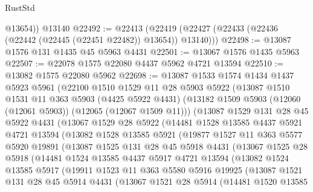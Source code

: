 \begin{lexlean}{RustStd}
\begin{coremodule}
        @13654))
    @13140
@22492 := @22413 (@22419 (@22427 (@22433 (@22436 (@22442 (@22445 (@22451 @22482)) @13654)) @13140)))
@22498 := @13087 @1576 @131 @1435 @45 @5963 @4431
@22501 := @13067 @1576 @1435 @5963
@22507 := @22078 @1575 @22080 @4437 @5962 @4721 @13594
@22510 := @13082 @1575 @22080 @5962
@22698 := @13087
    @1533
    @1574
    @1434
    @1437
    @5923
    @5961
    (@22100
      @1510
      @1529
      @11
      @28
      @5903
      @5922
      (@13087
        @1510
        @1531
        @11
        @363
        @5903
        (@4425 @5922 @4431)
        (@13182 @1509 @5903 (@12060 (@12061 @5903)) (@12065 (@12067 @1509 @11)))
        (@13087
          @1529
          @131
          @28
          @45
          @5922
          @4431
          (@13067
            @1529
            @28
            @5922
            (@14481
              @1528
              @13585
              @4437
              @5921
              @4721
              @13594
              (@13082
                @1528
                @13585
                @5921
                (@19877
                  @1527
                  @11
                  @363
                  @5577
                  @5920
                  @19891
                  (@13087
                    @1525
                    @131
                    @28
                    @45
                    @5918
                    @4431
                    (@13067
                      @1525
                      @28
                      @5918
                      (@14481
                        @1524
                        @13585
                        @4437
                        @5917
                        @4721
                        @13594
                        (@13082
                          @1524
                          @13585
                          @5917
                          (@19911
                            @1523
                            @11
                            @363
                            @5580
                            @5916
                            @19925
                            (@13087
                              @1521
                              @131
                              @28
                              @45
                              @5914
                              @4431
                              (@13067
                                @1521
                                @28
                                @5914
                                (@14481
                                  @1520
                                  @13585

\end{coremodule}
\end{lexlean}
